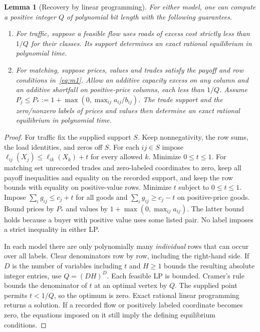 \documentclass[11pt,oneside,openany,notitlepage]{report}
\newtheorem{lemma}[theorem]{Lemma}
\begin{document}
\begin{lemma}[Recovery by linear programming]\label{lem:repair}
For either model, one can compute a positive integer \(Q\) of polynomial bit
length with the following guarantees.
\begin{enumerate}
\item For traffic, suppose a feasible flow uses roads of excess cost strictly
less than \(1/Q\) for their classes. Its support determines an exact rational
equilibrium in polynomial time.
\item For matching, suppose prices, values and trades satisfy the payoff and
row conditions in~\eqref{eq:m1}. Allow an additive capacity excess on any
column and an additive shortfall on positive-price columns, each less than
\(1/Q\). Assume \(P_j\le P_*:=1+\max(0,\max_{ij}a_{ij}/b_{ij})\).
The trade support and the zero/nonzero labels of prices and values then
determine an exact rational equilibrium in polynomial time.
\end{enumerate}
\end{lemma}
\begin{proof}
For traffic fix the supplied support \(S\). Keep nonnegativity, the row sums,
the load identities, and zeros off \(S\). For each \(ij\in S\) impose
\(\ell_{ij}(X_j)\le\ell_{ik}(X_k)+t\) for every allowed \(k\). Minimize
\(0\le t\le1\). For matching set unrecorded trades and zero-labeled
coordinates to zero, keep all payoff inequalities and equality on the
recorded support, and keep the row bounds with equality on positive-value
rows. Minimize \(t\) subject to \(0\le t\le1\). Impose
\(\sum_i g_{ij}\le c_j+t\) for all goods and
\(\sum_i g_{ij}\ge c_j-t\) on positive-price goods. Bound prices by \(P_*\)
and values by \(1+\max(0,\max_{ij}a_{ij})\). The latter bound holds because
a buyer with positive value uses some listed pair. No label imposes a strict
inequality in either LP.

In each model there are only polynomially many \emph{individual} rows
that can occur over all labels. Clear denominators row by row, including
the right-hand side. If \(D\) is the number of variables including \(t\)
and \(H\ge1\) bounds the resulting absolute integer entries, use
\(Q=(DH)^D\). Each feasible LP is bounded. Cramer's rule bounds the
denominator of \(t\) at an optimal vertex by \(Q\). The supplied point
permits \(t<1/Q\), so the optimum is zero. Exact rational linear programming
returns a solution. If a recorded flow or positively labeled coordinate
becomes zero, the equations imposed on it still imply the defining
equilibrium conditions.
\end{proof}
\end{document}
